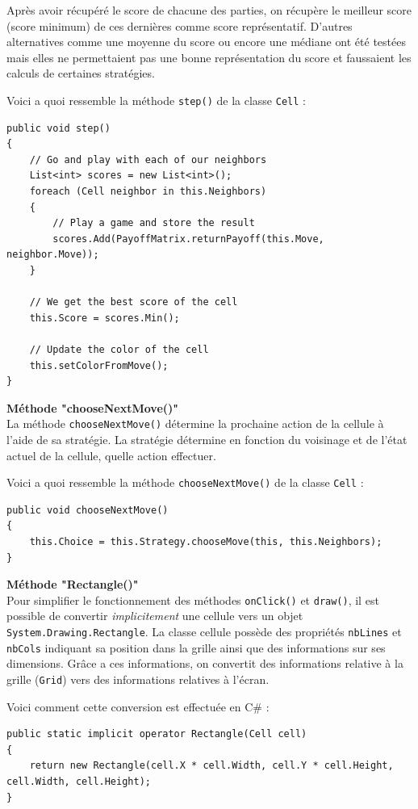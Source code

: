 \documentclass[a4paper, french]{article}
\begin{document}
Après avoir récupéré le score de chacune des parties, on récupère le meilleur score (score minimum) de ces dernières comme score représentatif. D'autres alternatives comme une moyenne du score ou encore une médiane \cite{Median} ont été testées mais elles ne permettaient pas une bonne représentation du score et faussaient les calculs de certaines stratégies.

Voici a quoi ressemble la méthode \texttt{step()} de la classe \texttt{Cell} :
\begin{lstlisting}
public void step()
{
    // Go and play with each of our neighbors
    List<int> scores = new List<int>();
    foreach (Cell neighbor in this.Neighbors)
    {
        // Play a game and store the result
        scores.Add(PayoffMatrix.returnPayoff(this.Move, neighbor.Move));
    }

    // We get the best score of the cell
    this.Score = scores.Min();

    // Update the color of the cell
    this.setColorFromMove();
}
\end{lstlisting}

\textbf{Méthode "chooseNextMove()"}\\
La méthode \texttt{chooseNextMove()} détermine la prochaine action de la cellule à l'aide de sa stratégie. La stratégie détermine en fonction du voisinage et de l'état actuel de la cellule, quelle action effectuer. 

Voici a quoi ressemble la méthode \texttt{chooseNextMove()} de la classe \texttt{Cell} :

\begin{lstlisting}
public void chooseNextMove()
{
    this.Choice = this.Strategy.chooseMove(this, this.Neighbors);
}
\end{lstlisting}

\textbf{Méthode "Rectangle()"}\\
Pour simplifier le fonctionnement des méthodes \texttt{onClick()} et \texttt{draw()}, il est possible de convertir \textit{implicitement} une cellule vers un objet \texttt{System.Drawing.Rectangle}. La classe cellule possède des propriétés \texttt{nbLines} et \texttt{nbCols} indiquant sa position dans la grille ainsi que des informations sur ses dimensions. Grâce a ces informations, on convertit des informations relative à la grille (\texttt{Grid}) vers des informations relatives à l'écran.

Voici comment cette conversion est effectuée en C\# :
\begin{lstlisting}
public static implicit operator Rectangle(Cell cell)
{
    return new Rectangle(cell.X * cell.Width, cell.Y * cell.Height, cell.Width, cell.Height);
}
\end{lstlisting}
\end{document}
